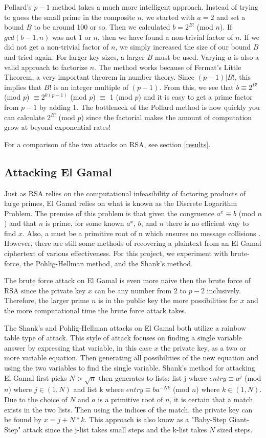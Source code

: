 \documentclass[12pt]{report}
\begin{document}
Pollard's $p-1$ method takes a much more intelligent approach. Instead of trying to guess the small prime in the composite $n$, we started with $a=2$ and set a bound
$B$ to be around 100 or so. Then we calculated $b=2^{B!}$ (mod $n$). If $gcd(b-1,n)$ was not 1 or $n$, then we have found a non-trivial factor of $n$. If we did not
get a non-trivial factor of $n$, we simply increased the size of our bound $B$ and tried again. For larger key sizes, a larger $B$ must be used. Varying $a$ is also a
valid approach to factorize $n$. The method works because of Fermat's Little Theorem, a very important theorem in number theory. Since $(p-1)|B!$, this implies that
$B!$ is an integer multiple of $(p-1)$. From this, we see that $b \equiv 2^{B!}$ (mod $p$) $\equiv 2^{k(p-1)}$ (mod $p$) $\equiv$ 1 (mod $p$) and it is easy to get
a prime factor from $p-1$ by adding 1. The bottleneck of the Pollard method is how quickly you can calculate $2^{B!}$ (mod $p$) since the factorial makes the amount
of computation grow at beyond exponential rates!

For a comparison of the two attacks on RSA, see section \ref{results}.

\subsection{Attacking El Gamal}
Just as RSA relies on the computational infeasibility of factoring products of large primes, El Gamal relies on what is known as the Discrete Logarithm Problem. The
premise of this problem is that given the congruence $a^{x} \equiv b$ (mod $n$) and that $n$ is prime, for some known $a^{x}$, $b$, and $n$ there is no efficient
way to find $x$. Also, a must be a primitive root of n which ensures no message collisions \cite{root}. However, there are still some methods of recovering a
plaintext from an El Gamal ciphertext of various effectiveness. For this project, we experiment with brute-force, the Pohlig-Hellman method, and the Shank's method.

The brute force attack on El Gamal is even more naive then the brute force of RSA since the private key $x$ can be any number from $2$ to $p-2$ inclusively.
Therefore, the larger prime $n$ is in the public key the more possibilities for $x$ and the more computational time the brute force attack takes.

The Shank's and Pohlig-Hellman attacks on El Gamal both utilize a rainbow table type of attack. This style of attack focuses on finding a single variable answer
by expressing that variable, in this case $x$ the private key, as a two or more variable equation. Then generating all possibilities of the new equation and using
the two variables to find the single variable. Shank's method for attacking El Gamal first picks $N > \sqrt{n}$ then generates to lists: list j where
$entry \equiv a^{j}$ (mod $n$) where $j \in (1,N)$ and list k where $entry \equiv ba^{-Nk}$ (mod $n$) where $k \in (1,N)$. Due to the choice of $N$ and $a$ is a
primitive root of $n$, it is certain that a match exists in the two lists. Then using the indices of the match, the private key can be found by $x = j + N*k$. This
approach is also know as a "Baby-Step Giant-Step" attack since the j-list takes small steps and the k-list takes $N$ sized steps.
\end{document}
